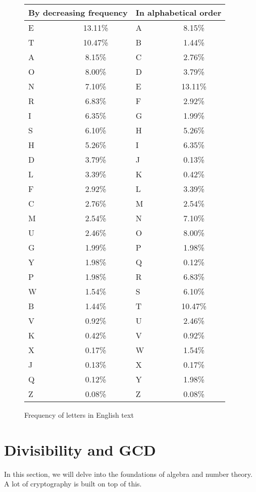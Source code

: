 \documentclass[openany]{book}
\begin{document}
\begin{figure}[H]
	\begin{center}
		\begin{tabular}{|l c||l c|}
			\hline
			\multicolumn{2}{|c||}{By decreasing frequency} & \multicolumn{2}{c|}{In alphabetical order} \\
			\hline
			E & 13.11\% & A & 8.15\% \\
			T & 10.47\% & B & 1.44\% \\
			A & 8.15\% & C & 2.76\% \\
			O & 8.00\% & D & 3.79\% \\
			N & 7.10\% & E & 13.11\% \\
			R & 6.83\% & F & 2.92\% \\
			I & 6.35\% & G & 1.99\% \\
			S & 6.10\% & H & 5.26\% \\
			H & 5.26\% & I & 6.35\% \\
			D & 3.79\% & J & 0.13\% \\
			L & 3.39\% & K & 0.42\% \\
			F & 2.92\% & L & 3.39\% \\
			C & 2.76\% & M & 2.54\% \\
			M & 2.54\% & N & 7.10\% \\
			U & 2.46\% & O & 8.00\% \\
			G & 1.99\% & P & 1.98\% \\
			Y & 1.98\% & Q & 0.12\% \\
			P & 1.98\% & R & 6.83\% \\
			W & 1.54\% & S & 6.10\% \\
			B & 1.44\% & T & 10.47\% \\
			V & 0.92\% & U & 2.46\% \\
			K & 0.42\% & V & 0.92\% \\
			X & 0.17\% & W & 1.54\% \\
			J & 0.13\% & X & 0.17\% \\
			Q & 0.12\% & Y & 1.98\% \\
			Z & 0.08\% & Z & 0.08\% \\
			\hline
		\end{tabular}
		\caption{Frequency of letters in English text}
		\label{fig:1.2}
	\end{center}
\end{figure}

\section{Divisibility and GCD}
In this section, we will delve into the foundations of algebra and number theory. A lot of cryptography is built on top of this.
\end{document}
